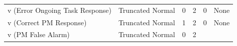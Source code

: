 \documentclass[11pt,]{article}
\begin{document}
\begin{longtable}[]{@{}llcccc@{}}
\begin{minipage}[t]{0.28\columnwidth}
v (Error Ongoing Task Response)\strut
\end{minipage} & \begin{minipage}[t]{0.20\columnwidth}\raggedright\strut
Truncated Normal\strut
\end{minipage} & \begin{minipage}[t]{0.08\columnwidth}\centering\strut
0\strut
\end{minipage} & \begin{minipage}[t]{0.06\columnwidth}\centering\strut
2\strut
\end{minipage} & \begin{minipage}[t]{0.09\columnwidth}\centering\strut
0\strut
\end{minipage} & \begin{minipage}[t]{0.09\columnwidth}\centering\strut
None\strut
\end{minipage}\tabularnewline
\begin{minipage}[t]{0.28\columnwidth}\raggedright\strut
v (Correct PM Response)\strut
\end{minipage} & \begin{minipage}[t]{0.20\columnwidth}\raggedright\strut
Truncated Normal\strut
\end{minipage} & \begin{minipage}[t]{0.08\columnwidth}\centering\strut
1\strut
\end{minipage} & \begin{minipage}[t]{0.06\columnwidth}\centering\strut
2\strut
\end{minipage} & \begin{minipage}[t]{0.09\columnwidth}\centering\strut
0\strut
\end{minipage} & \begin{minipage}[t]{0.09\columnwidth}\centering\strut
None\strut
\end{minipage}\tabularnewline
\begin{minipage}[t]{0.28\columnwidth}\raggedright\strut
v (PM False Alarm)\strut
\end{minipage} & \begin{minipage}[t]{0.20\columnwidth}\raggedright\strut
Truncated Normal\strut
\end{minipage} & \begin{minipage}[t]{0.08\columnwidth}\centering\strut
0\strut
\end{minipage} & \begin{minipage}[t]{0.06\columnwidth}\centering\strut
2\strut
\end{minipage} & \begin{minipage}[t]{0.09\columnwidth}\centering\strut

\end{minipage}
\end{longtable}
\end{document}
